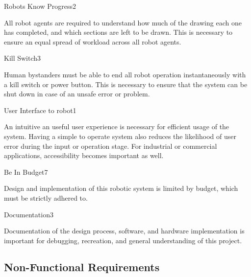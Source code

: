 \begin{functional_requirement}{Robots Know Progress}{2}
\item All robot agents are required to understand how much of the drawing each one has completed, and which sections are left to be drawn. This is necessary to ensure an equal spread of workload across all robot agents.
\end{functional_requirement}

\begin{functional_requirement}{Kill Switch}{3}
\item Human bystanders must be able to end all robot operation instantaneously with a kill switch or power button. This is necessary to ensure that the system can be shut down in case of an unsafe error or problem.
\end{functional_requirement}

\begin{functional_requirement}{User Interface to robot}{1}
\item An intuitive an useful user experience is necessary for efficient usage of the system. Having a simple to operate system also reduces the likelihood of user error during the input or operation stage. For industrial or commercial applications, accessibility becomes important as well. 
\end{functional_requirement}

\begin{functional_requirement}{Be In Budget}{7}
\item Design and implementation of this robotic system is limited by budget, which must be strictly adhered to.
\end{functional_requirement}

\begin{functional_requirement}{Documentation}{3}
\item Documentation of the design process, software, and hardware implementation is important for debugging, recreation, and general understanding of this project.
\end{functional_requirement}


\subsection{Non-Functional Requirements}
\label{sec:nonfunctional_requirements}

